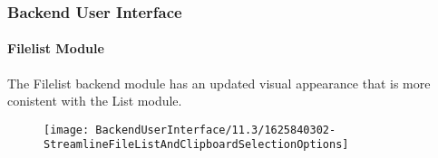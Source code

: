 %

\begin{frame}[fragile]
	\frametitle{Backend User Interface}
	\framesubtitle{Filelist Module}

	The Filelist backend module has an updated visual appearance that is more
	conistent with the List module.

	\begin{figure}
		\texttt{[image: BackendUserInterface/11.3/1625840302-StreamlineFileListAndClipboardSelectionOptions]}
	\end{figure}

\end{frame}

